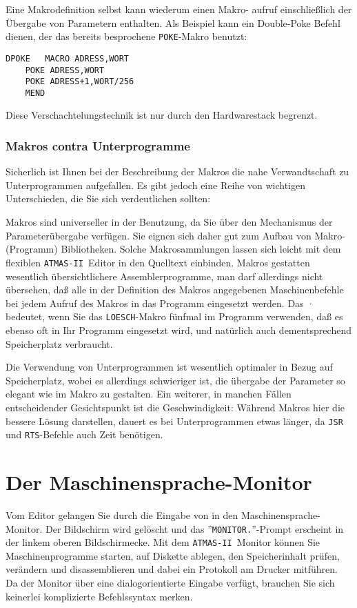 \documentclass[10pt,a4paper,twoside,final,openright,titlepage]{memoir}
\def\atmas{\texttt{AT\-MAS-II }}
\newcommand{\key}[1]{\keystroke{\tiny #1}}
\begin{document}
Eine Makrodefinition selbst kann wiederum einen Makro-
aufruf einschließlich der Übergabe von Parametern
enthalten. Als Beispiel kann ein Double-Poke Befehl
dienen, der das bereits besprochene \texttt{POKE}-Makro benutzt:

\begin{Verbatim}[samepage=true]
DPOKE   MACRO ADRESS,WORT
	POKE ADRESS,WORT
	POKE ADRESS+1,WORT/256
	MEND
\end{Verbatim}

Diese Verschachtelungstechnik ist nur durch den Hardwarestack begrenzt.

\subsection{Makros contra Unterprogramme}

Sicherlich ist Ihnen bei der Beschreibung der Makros
die nahe Verwandtschaft zu Unterprogrammen aufgefallen.
Es gibt jedoch eine Reihe von wichtigen Unterschieden,
die Sie sich verdeutlichen sollten:

Makros sind universeller in der Benutzung, da Sie über
den Mechanismus der Parameterübergabe verfügen. Sie
eignen sich daher gut zum Aufbau von Makro- (Programm)
Bibliotheken. Solche Makrosammlungen lassen sich
leicht mit dem flexiblen \atmas Editor in den
Quelltext einbinden. Makros gestatten wesentlich
übersichtlichere Assemblerprogramme, man darf allerdings nicht übersehen, daß alle in der Definition des
Makros angegebenen Maschinenbefehle bei jedem Aufruf
des Makros in das Programm eingesetzt werden. Das ·
bedeutet, wenn Sie das \texttt{LOESCH}-Makro fünfmal im Programm verwenden, daß es ebenso oft in Ihr Programm
eingesetzt wird, und natürlich auch dementsprechend
Speicherplatz verbraucht.

Die Verwendung von Unterprogrammen ist wesentlich
optimaler in Bezug auf Speicherplatz, wobei es allerdings schwieriger ist, die übergabe der Parameter so
elegant wie im Makro zu gestalten. Ein weiterer, in
manchen Fällen entscheidender Gesichtspunkt ist die
Geschwindigkeit: Während Makros hier die bessere
Lösung darstellen, dauert es bei Unterprogrammen etwas
länger, da \texttt{JSR} und \texttt{RTS}-Befehle auch Zeit benötigen.

\chapter{Der Maschinensprache-Monitor}

Vom Editor gelangen Sie durch die Eingabe von \key{CTRL-P}
in den Maschinen\-sprache-Monitor. Der Bildschirm wird
gelöscht und das ''\texttt{MONITOR.}''-Prompt erscheint in der
linkem oberen Bildschirmecke. Mit dem \atmas Monitor
können Sie Maschinenprogramme starten, auf Diskette
ablegen, den Speicherinhalt prüfen, verändern und
disassemblieren und dabei ein Protokoll am Drucker
mitführen. Da der Monitor über eine dialogorientierte
Eingabe verfügt, brauchen Sie sich keinerlei komplizierte Befehlssyntax merken.
\end{document}
